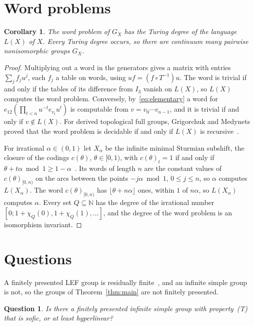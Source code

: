 \documentclass[11pt]{amsart}
\newtheorem{corollary}[theorem]{Corollary}
\newtheorem{question}{Question}
\begin{document}
\section{Word problems}

\begin{corollary}\label{cor:wp}
The word problem of $G_X$ has the Turing degree of the language $L(X)$
of $X$. Every Turing degree occurs, so there are continuum many pairwise
nonisomorphic groups $G_X$.
\end{corollary}

\begin{proof}
Multiplying out a word in the generators gives a matrix with entries
$\sum_jf_ju^j$, each $f_j$ a table on words, using $uf=(f\circ T^{-1})u$.
The word is trivial if and only if the tables of its difference from
$I_3$ vanish on $L(X)$, so $L(X)$ computes the word problem. Conversely,
by~\eqref{eq:elementary} a word for $e_{12}(\prod_{t<n}u^{-t}e_{v_t}u^t)$
is computable from $v=v_0\cdots v_{n-1}$, and it is trivial if and only
if $v\notin L(X)$. For derived topological full groups, Grigorchuk and
Medynets proved that the word problem is decidable if and only if
$L(X)$ is recursive~\cite[Theorem~1.1(3)]{GMpres}.

For irrational $\alpha\in(0,1)$ let $X_\alpha$ be the infinite minimal
Sturmian subshift, the closure of the codings $c(\theta)$,
$\theta\in[0,1)$, with $c(\theta)_t=1$ if and only if
$\theta+t\alpha\bmod1\ge1-\alpha$~\cite{MorseHedlund}. Its words of
length $n$ are the constant values of $c(\theta)_{[0,n)}$ on the arcs
between the points $-j\alpha\bmod1$, $0\le j\le n$, so $\alpha$ computes
$L(X_\alpha)$. The word $c(\theta)_{[0,n)}$ has
$\lfloor\theta+n\alpha\rfloor$ ones, within $1$ of $n\alpha$, so
$L(X_\alpha)$ computes $\alpha$. Every set $Q\subseteq\mathbb N$ has the
degree of the irrational number $[0;1+\chi_Q(0),1+\chi_Q(1),\dots]$, and
the degree of the word problem is an isomorphism invariant.
\end{proof}

\section{Questions}

A finitely presented LEF group is residually finite~\cite{VershikGordon},
and an infinite simple group is not, so the groups of
Theorem~\ref{thm:main} are not finitely presented.

\begin{question}
Is there a finitely presented infinite simple group with
property~\textup{(T)} that is sofic, or at least hyperlinear?
\end{question}
\end{document}
